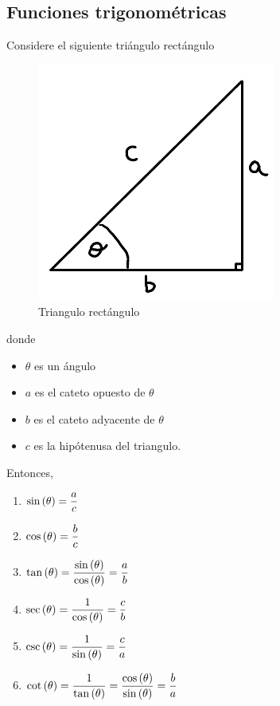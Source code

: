 \documentclass[../../main.tex]{subfiles}
\begin{document}
    \subsection{Funciones trigonométricas}
        Considere el siguiente triángulo rectángulo
            \begin{figure}[H]
                \begin{center}\includegraphics[scale=0.8]{triangulo.pdf}\end{center}
                \caption{Triangulo rectángulo}
            \end{figure}
        donde
            \begin{itemize}
            	\item $\theta$ es un ángulo
            	\item $a$ es el cateto opuesto de $\theta$
            	\item $b$ es el cateto adyacente de $\theta$
            	\item $c$ es la hipótenusa del triangulo.
            \end{itemize}
        Entonces,
            \begin{enumerate}
            	\item $\displaystyle \sin\left( \theta \right) = \frac a c$
            	\item $\displaystyle \cos\left( \theta \right) = \frac b c$
            	\item $\displaystyle \tan\left( \theta \right) = \frac {\sin\left( \theta \right)} {\cos\left( \theta \right)} = \frac a b$
            	\item $\displaystyle \sec\left( \theta \right) = \frac {1} {\cos\left( \theta \right)} = \frac c b$
            	\item $\displaystyle \csc\left( \theta \right) = \frac {1} {\sin\left( \theta \right)} = \frac c a$
            	\item $\displaystyle \cot\left( \theta \right) = \frac {1} {\tan\left( \theta \right)} = \frac {\cos\left( \theta \right)} {\sin\left( \theta \right)} = \frac b a$
            \end{enumerate}
    
\end{document}
